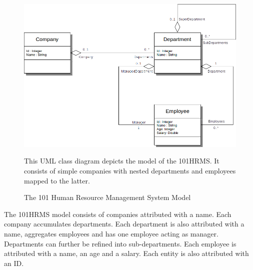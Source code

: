 \begin{figure}[h!]
\begin{center}
\includegraphics[scale=.5]{images/101HRMSModel.png}
\end{center}
{
\scriptsize 
This \gls{UML} class diagram depicts the model of the \gls{101HRMS}.
It consists of simple companies with nested departments and employees mapped to the latter.
}
\caption{The 101 Human Resource Management System Model}
\label{figure:101HRMSModel}
\end{figure}

The \gls{101HRMS} model consists of companies attributed with a name.
Each company accumulates departments.
Each department is also attributed with a name, aggregates employees and has one employee acting as manager.
Departments can further be refined into sub-departments.
Each employee is attributed with a name, an age and a salary.
Each entity is also attributed with an ID.

